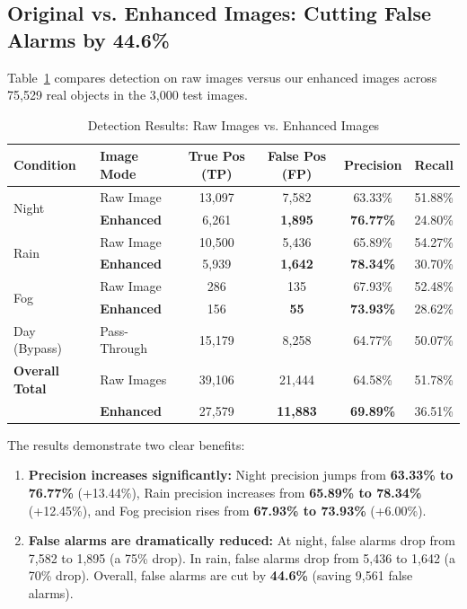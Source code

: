 \documentclass{article}
\begin{document}
\subsection{Original vs. Enhanced Images: Cutting False Alarms by 44.6\%}
Table~\ref{tab:orig_vs_enh} compares detection on raw images versus our enhanced images across 75,529 real objects in the 3,000 test images. 

\begin{table}[!ht]
\centering
\small
\caption{Detection Results: Raw Images vs. Enhanced Images}
\label{tab:orig_vs_enh}
\begin{tabular}{llcccc}
\toprule
\textbf{Condition} & \textbf{Image Mode} & \textbf{True Pos (TP)} & \textbf{False Pos (FP)} & \textbf{Precision} & \textbf{Recall} \\
\midrule
\multirow{2}{*}{Night} & Raw Image & 13,097 & 7,582 & 63.33\% & 51.88\% \\
& \textbf{Enhanced} & 6,261 & \textbf{1,895} & \textbf{76.77\%} & 24.80\% \\
\midrule
\multirow{2}{*}{Rain} & Raw Image & 10,500 & 5,436 & 65.89\% & 54.27\% \\
& \textbf{Enhanced} & 5,939 & \textbf{1,642} & \textbf{78.34\%} & 30.70\% \\
\midrule
\multirow{2}{*}{Fog} & Raw Image & 286 & 135 & 67.93\% & 52.48\% \\
& \textbf{Enhanced} & 156 & \textbf{55} & \textbf{73.93\%} & 28.62\% \\
\midrule
Day (Bypass) & Pass-Through & 15,179 & 8,258 & 64.77\% & 50.07\% \\
\midrule
\textbf{Overall Total} & Raw Images & 39,106 & 21,444 & 64.58\% & 51.78\% \\
& \textbf{Enhanced} & 27,579 & \textbf{11,883} & \textbf{69.89\%} & 36.51\% \\
\bottomrule
\end{tabular}
\end{table}

The results demonstrate two clear benefits:
\begin{enumerate}
    \item \textbf{Precision increases significantly:} Night precision jumps from \textbf{63.33\% to 76.77\%} (+13.44\%), Rain precision increases from \textbf{65.89\% to 78.34\%} (+12.45\%), and Fog precision rises from \textbf{67.93\% to 73.93\%} (+6.00\%).
    \item \textbf{False alarms are dramatically reduced:} At night, false alarms drop from 7,582 to 1,895 (a 75\% drop). In rain, false alarms drop from 5,436 to 1,642 (a 70\% drop). Overall, false alarms are cut by \textbf{44.6\%} (saving 9,561 false alarms).
\end{enumerate}
\end{document}
